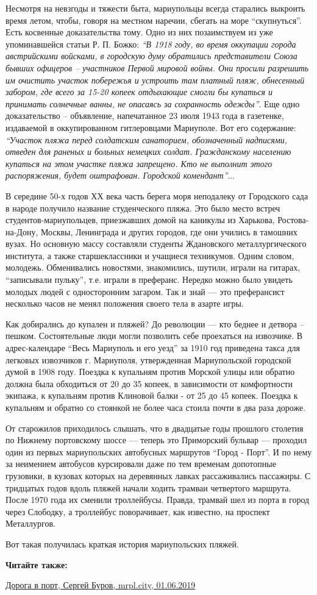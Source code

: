 Несмотря на невзгоды и тяжести быта, мариупольцы всегда старались выкроить
время летом, чтобы, говоря на местном наречии, сбегать на море \enquote{скупнуться}.
Есть косвенные доказательства тому. Одно из них позаимствуем из уже
упоминавшейся статьи Р. П. Божко: \emph{\enquote{В 1918 году, во время оккупации города
австрийскими войсками, в городскую думу обратились представители Союза бывших
офицеров – участников Первой мировой войны. Они просили разрешить им очистить
участок побережья и устроить там платный пляж, обнесенный забором, где всего за
15-20 копеек отдыхающие смогли бы купаться и принимать солнечные ванны, не
опасаясь за сохранность одежды}}. Еще одно доказательство – объявление,
напечатанное 23 июля 1943 года в газетенке, издаваемой в оккупированном
гитлеровцами Мариуполе. Вот его содержание: \emph{\enquote{Участок пляжа перед солдатским
санаторием, обозначенный надписями, отведен для раненых и больных немецких
солдат. Гражданскому населению купаться на этом участке пляжа запрещено. Кто не
выполнит этого распоряжения, будет оштрафован. Городской комендант}}...

В середине 50-х годов ХХ века часть берега моря неподалеку от Городского сада в
народе получило название студенческого пляжа. Это было место встреч
студентов-мариупольцев, приезжавших домой на каникулы из Харькова,
Ростова-на-Дону, Москвы, Ленинграда и других городов, где они учились в
тамошних вузах. Но основную массу составляли студенты Ждановского
металлургического института, а также старшеклассники и учащиеся техникумов.
Одним словом, молодежь. Обменивались новостями, знакомились, шутили, играли на
гитарах, \enquote{записывали пульку}, т.е. играли в преферанс. Нередко можно было
увидеть молодых людей с односторонним загаром. Так и знай — это преферансист
несколько часов не менял положения своего тела в азарте игры.

Как добирались до купален и пляжей? До революции — кто беднее и детвора –
пешком. Состоятельные люди могли позволить себе проехаться на извозчике. В
адрес-календаре \enquote{Весь Мариуполь и его уезд} за 1910 год приведена такса для
легковых извозчиков г. Мариуполя, утвержденная Мариупольской городской думой в
1908 году. Поездка к купальням против Морской улицы или обратно должна была
обходиться от 20 до 35 копеек, в зависимости от комфортности экипажа, к
купальням против Клиновой балки - от 25 до 45 копеек. Поездка к купальням и
обратно со стоянкой не более часа стоила почти в два раза дороже.

От старожилов приходилось слышать, что в двадцатые годы прошлого столетия по
Нижнему портовскому шоссе — теперь это Приморский бульвар — проходил один из
первых мариупольских автобусных маршрутов \enquote{Город - Порт}. И по нему за
неимением автобусов курсировали даже по тем временам допотопные грузовики, в
кузовах которых на деревянных лавках рассаживались пассажиры. С тридцатых годов
вдоль пляжей начали ходить трамваи четвертого маршрута. После 1970 года их
сменили троллейбусы. Правда, трамвай шел из порта в город через Слободку, а
троллейбус поворачивает, как известно, на проспект Металлургов.

Вот такая получилась краткая история мариупольских пляжей.

\textbf{Читайте также:} 

\href{https://archive.org/details/01_06_2019.sergij_burov.mrpl_city.doroga_v_port}{Дорога в порт, Сергей Буров, mrpl.city, 01.06.2019}
